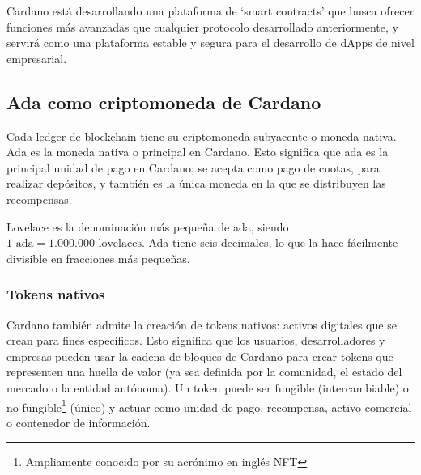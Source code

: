 \documentclass[12pt]{book}
\begin{document}
Cardano está desarrollando una plataforma de `smart contracts' que busca ofrecer funciones más avanzadas que cualquier protocolo desarrollado anteriormente, y servirá como una plataforma estable y segura para el desarrollo de dApps de nivel empresarial.

\subsection{Ada como criptomoneda de Cardano}


Cada ledger de blockchain tiene su criptomoneda subyacente o moneda nativa. Ada es la moneda nativa o principal en Cardano. Esto significa que ada es la principal unidad de pago en Cardano; se acepta como pago de cuotas, para realizar depósitos, y también es la única moneda en la que se distribuyen las recompensas.

Lovelace es la denominación más pequeña de ada, siendo $\boxed{ 1 \text{ ada} = 1.000.000 \text{ lovelaces}}$. Ada tiene seis decimales, lo que la hace fácilmente divisible en fracciones más pequeñas.

\subsubsection{Tokens nativos}

Cardano también admite la creación de tokens nativos: activos digitales que se crean para fines específicos. Esto significa que los usuarios, desarrolladores y empresas pueden usar la cadena de bloques de Cardano para crear tokens que representen una huella de valor (ya sea definida por la comunidad, el estado del mercado o la entidad autónoma). Un token puede ser fungible (intercambiable) o no fungible\footnote{Ampliamente conocido por su acrónimo en inglés NFT} (único) y actuar como unidad de pago, recompensa, activo comercial o contenedor de información.



\end{document}
